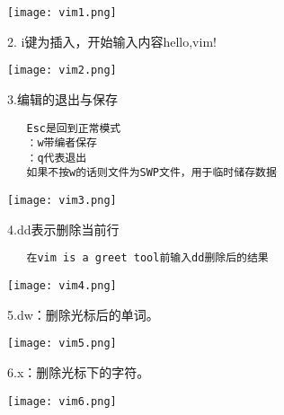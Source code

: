 \documentclass{article}
\begin{document}
\noindent
\begin{minipage}{\linewidth}
  \centering
  \texttt{[image: vim1.png]}
  \label{fig:example}
\end{minipage}

2. i键为插入，开始输入内容hello,vim!

\noindent
\begin{minipage}{\linewidth}
  \centering
  \texttt{[image: vim2.png]}
  \label{fig:example}
\end{minipage}

3.编辑的退出与保存
\begin{verbatim}
   Esc是回到正常模式
   ：w带编者保存
   ：q代表退出
   如果不按w的话则文件为SWP文件，用于临时储存数据
\end{verbatim}

\noindent
\begin{minipage}{\linewidth}
 \centering
  \texttt{[image: vim3.png]}
  \label{fig:example}
\end{minipage}



4.dd表示删除当前行
\begin{verbatim}
   在vim is a greet tool前输入dd删除后的结果
\end{verbatim}


\noindent
\begin{minipage}{\linewidth}
 \centering
  \texttt{[image: vim4.png]}
  \label{fig:example}
\end{minipage}

5.dw：删除光标后的单词。

\noindent
\begin{minipage}{\linewidth}
 \centering
  \texttt{[image: vim5.png]}
  \label{fig:example}
\end{minipage}

6.x：删除光标下的字符。

\noindent
\begin{minipage}{\linewidth}
 \centering
  \texttt{[image: vim6.png]}
  \label{fig:example}
\end{minipage}
\end{document}
